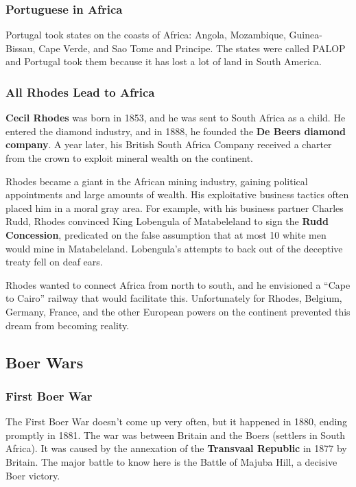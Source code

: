 \subsubsection*{Portuguese in Africa}

Portugal took states on the coasts of Africa:
Angola,
Mozambique,
Guinea-Bissau,
Cape Verde,
and Sao Tome and Principe.
The states were called PALOP and Portugal took them because it has lost a lot of land in South America.

\subsubsection*{All Rhodes Lead to Africa}

\textbf{Cecil Rhodes} was born in 1853, and he was sent to South Africa as a child.
He entered the diamond industry, and in 1888, he founded the \textbf{De Beers diamond company}.
A year later,
his British South Africa Company received a charter from the crown to exploit mineral wealth on the continent.

Rhodes became a giant in the African mining industry, gaining political appointments and large amounts of wealth.
His exploitative business tactics often placed him in a moral gray area.
For example, with his business partner Charles Rudd,
Rhodes convinced King Lobengula of Matabeleland to sign the \textbf{Rudd Concession},
predicated on the false assumption that at most 10 white men would mine in Matabeleland.
Lobengula's attempts to back out of the deceptive treaty fell on deaf ears.

Rhodes wanted to connect Africa from north to south,
and he envisioned a ``Cape to Cairo'' railway that would facilitate this.
Unfortunately for Rhodes, Belgium, Germany, France,
and the other European powers on the continent prevented this dream from becoming reality.

\subsection*{Boer Wars}

\subsubsection*{First Boer War}

The First Boer War doesn't come up very often, but it happened in 1880, ending promptly in 1881.
The war was between Britain and the Boers (settlers in South Africa).
It was caused by the annexation of the \textbf{Transvaal Republic} in 1877 by Britain.
The major battle to know here is the Battle of Majuba Hill, a decisive Boer victory.

